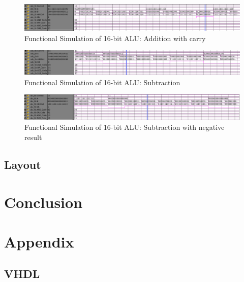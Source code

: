 \documentclass[11pt]{article}
\begin{document}
			\begin{figure}[H]
				\centering
				\includegraphics[width=0.7\linewidth]{"Pictures/16 Bit ALU Add Carry"}
				\caption{Functional Simulation of 16-bit ALU: Addition with carry}
				\label{fig:16-bit-alu-add-carry}
			\end{figure}
		
			
			\begin{figure}[H]
				\centering
				\includegraphics[width=0.7\linewidth]{"Pictures/16 Bit Alu Sub Pos"}
				\caption{Functional Simulation of 16-bit ALU: Subtraction}
				\label{fig:16-bit-alu-sub-pos}
			\end{figure}
			
	
			\begin{figure}[H]
				\centering
				\includegraphics[width=0.7\linewidth]{"Pictures/16 Bit ALU Sub Neg"}
				\caption{Functional Simulation of 16-bit ALU: Subtraction with negative result}
				\label{fig:16-bit-alu-sub-neg}
			\end{figure}
		
		
	\subsection{Layout}
	
	
	\subsection{}
	

\section{Conclusion}


\section{Appendix}

	\subsection{VHDL}
	
\end{document}
